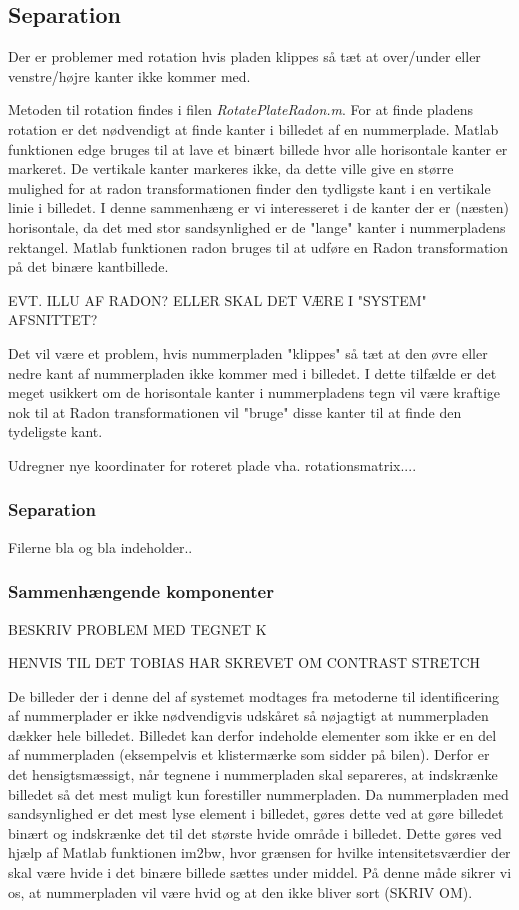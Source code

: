 \subsection{Separation}
\label{sec:implementation/sep/rotation}

Der er problemer med rotation hvis pladen klippes så tæt at over/under eller venstre/højre kanter ikke kommer med.

Metoden til rotation findes i filen \textit{RotatePlateRadon.m}. For at finde pladens rotation er det nødvendigt at finde kanter i billedet af en nummerplade. Matlab funktionen edge bruges til at lave et binært billede hvor alle horisontale kanter er markeret. De vertikale kanter markeres ikke, da dette ville give en større mulighed for at radon transformationen finder den tydligste kant i en vertikale linie i billedet. I denne sammenhæng er vi interesseret i de kanter der er (næsten) horisontale, da det med stor sandsynlighed er de "lange" kanter i nummerpladens rektangel. Matlab funktionen radon bruges til at udføre en Radon transformation på det binære kantbillede.

EVT. ILLU AF RADON? ELLER SKAL DET VÆRE I "SYSTEM" AFSNITTET?

Det vil være et problem, hvis nummerpladen "klippes" så tæt at den øvre eller nedre kant af nummerpladen ikke kommer med i billedet. I dette tilfælde er det meget usikkert om de horisontale kanter i nummerpladens tegn vil være kraftige nok til at Radon transformationen vil "bruge" disse kanter til at finde den tydeligste kant.

Udregner nye koordinater for roteret plade vha. rotationsmatrix....

\subsubsection{Separation}

Filerne bla og bla indeholder..

\subsubsection*{Sammenhængende komponenter}

BESKRIV PROBLEM MED TEGNET K

HENVIS TIL DET TOBIAS HAR SKREVET OM CONTRAST STRETCH

De billeder der i denne del af systemet modtages fra metoderne til identificering af nummerplader er ikke nødvendigvis udskåret så nøjagtigt at nummerpladen dækker hele billedet. Billedet kan derfor indeholde elementer som ikke er en del af nummerpladen (eksempelvis et klistermærke som sidder på bilen). Derfor er det hensigtsmæssigt, når tegnene i nummerpladen skal separeres, at indskrænke billedet så det mest muligt kun forestiller nummerpladen. Da nummerpladen med sandsynlighed er det mest lyse element i billedet, gøres dette ved at gøre billedet binært og indskrænke det til det største hvide område i billedet. Dette gøres ved hjælp af Matlab funktionen im2bw, hvor grænsen for hvilke intensitetsværdier der skal være hvide i det binære billede sættes under middel. På denne måde sikrer vi os, at nummerpladen vil være hvid og at den ikke bliver sort (SKRIV OM).

